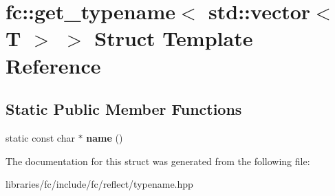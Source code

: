 \hypertarget{structfc_1_1get__typename_3_01std_1_1vector_3_01_t_01_4_01_4}{}\section{fc\+:\+:get\+\_\+typename$<$ std\+:\+:vector$<$ T $>$ $>$ Struct Template Reference}
\label{structfc_1_1get__typename_3_01std_1_1vector_3_01_t_01_4_01_4}
\subsection*{Static Public Member Functions}
\begin{DoxyCompactItemize}
\item 
\mbox{\label{structfc_1_1get__typename_3_01std_1_1vector_3_01_t_01_4_01_4_aff2ee28b2908a25eea2865dd81607551}} 
static const char $\ast$ {\bfseries name} ()
\end{DoxyCompactItemize}


The documentation for this struct was generated from the following file\+:\begin{DoxyCompactItemize}
\item 
libraries/fc/include/fc/reflect/typename.\+hpp\end{DoxyCompactItemize}
